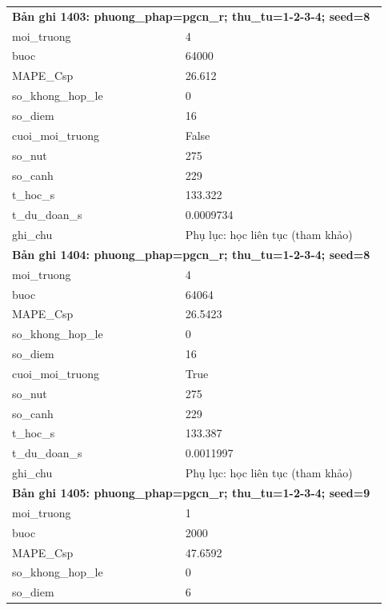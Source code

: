 \begin{longtable}{p{0.43\linewidth}p{0.50\linewidth}}
\midrule
\multicolumn{2}{p{0.95\linewidth}}{\textbf{Bản ghi 1403: phuong\_phap=pgcn\_r; thu\_tu=1-2-3-4; seed=8}} \\
moi\_\allowbreak truong & 4 \\
buoc & 64000 \\
MAPE\_\allowbreak Csp & 26.612 \\
so\_\allowbreak khong\_\allowbreak hop\_\allowbreak le & 0 \\
so\_\allowbreak diem & 16 \\
cuoi\_\allowbreak moi\_\allowbreak truong & False \\
so\_\allowbreak nut & 275 \\
so\_\allowbreak canh & 229 \\
t\_\allowbreak hoc\_\allowbreak s & 133.322 \\
t\_\allowbreak du\_\allowbreak doan\_\allowbreak s & 0.0009734 \\
ghi\_\allowbreak chu & Phụ lục: học liên tục (tham khảo) \\
\midrule
\multicolumn{2}{p{0.95\linewidth}}{\textbf{Bản ghi 1404: phuong\_phap=pgcn\_r; thu\_tu=1-2-3-4; seed=8}} \\
moi\_\allowbreak truong & 4 \\
buoc & 64064 \\
MAPE\_\allowbreak Csp & 26.5423 \\
so\_\allowbreak khong\_\allowbreak hop\_\allowbreak le & 0 \\
so\_\allowbreak diem & 16 \\
cuoi\_\allowbreak moi\_\allowbreak truong & True \\
so\_\allowbreak nut & 275 \\
so\_\allowbreak canh & 229 \\
t\_\allowbreak hoc\_\allowbreak s & 133.387 \\
t\_\allowbreak du\_\allowbreak doan\_\allowbreak s & 0.0011997 \\
ghi\_\allowbreak chu & Phụ lục: học liên tục (tham khảo) \\
\midrule
\multicolumn{2}{p{0.95\linewidth}}{\textbf{Bản ghi 1405: phuong\_phap=pgcn\_r; thu\_tu=1-2-3-4; seed=9}} \\
moi\_\allowbreak truong & 1 \\
buoc & 2000 \\
MAPE\_\allowbreak Csp & 47.6592 \\
so\_\allowbreak khong\_\allowbreak hop\_\allowbreak le & 0 \\
so\_\allowbreak diem & 6 \\

\end{longtable}
